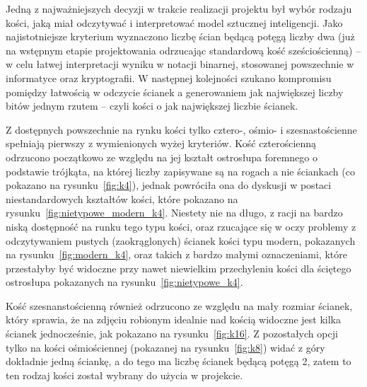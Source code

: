 Jedną z najważniejszych decyzji w trakcie realizacji projektu był wybór rodzaju kości, jaką miał odczytywać
i interpretować model sztucznej inteligencji.
Jako najistotniejsze kryterium wyznaczono liczbę ścian będącą potęgą liczby dwa
(już na wstępnym etapie projektowania odrzucając standardową kość sześciościenną) --
w celu łatwej interpretacji wyniku w notacji binarnej, stosowanej powszechnie w informatyce oraz kryptografii.
W następnej kolejności szukano kompromisu pomiędzy łatwością w odczycie ścianek a generowaniem jak największej liczby
bitów jednym rzutem -- czyli kości o jak największej liczbie ścianek.

Z dostępnych powszechnie na rynku kości tylko cztero-, ośmio- i szesnastościenne spełniają pierwszy z wymienionych wyżej kryteriów.
Kość czterościenną odrzucono początkowo ze względu na jej kształt ostrosłupa foremnego o podstawie trójkąta,
na której liczby zapisywane są na rogach a nie ściankach (co pokazano na rysunku~\ref{fig:k4}),
jednak powróciła ona do dyskusji w postaci niestandardowych kształtów kości, które pokazano na rysunku~\ref{fig:nietypowe_modern_k4}.
Niestety nie na długo, z racji na bardzo niską dostępność na runku tego typu kości, oraz rzucające się w oczy problemy
z odczytywaniem pustych (zaokrąglonych) ścianek kości typu modern, pokazanych na rysunku~\ref{fig:modern_k4},
oraz takich z bardzo małymi oznaczeniami, które przestałyby być widoczne przy nawet niewielkim przechyleniu kości
dla ściętego ostrosłupa pokazanych na rysunku~\ref{fig:nietypowe_k4}.

Kość szesnanstościenną również odrzucono ze względu na mały rozmiar ścianek, który sprawia,
że na zdjęciu robionym idealnie nad kością widoczne jest kilka ścianek jednocześnie, jak pokazano na rysunku~\ref{fig:k16}.
Z pozostałych opcji tylko na kości ośmiościennej (pokazanej na rysunku~\ref{fig:k8}) widać z góry dokładnie jedną ściankę,
a do tego ma liczbę ścianek będącą potęgą 2, zatem to ten rodzaj kości został wybrany do użycia w projekcie.


